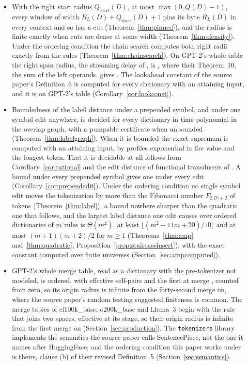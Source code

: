 \documentclass[11pt,a4paper]{article}
\theoremstyle{definition}
\theoremstyle{plain}
\newcommand{\code}[1]{\texttt{#1}}
\newcommand{\ripple}{R_{L}}
\begin{document}
\begin{itemize}
behavior gives the radius under every prepended string from its transitions alone, by the contraction of definite
automata \citep{steinby1969definite} (Corollary~\ref{cor:tail}).
\item With the right start radius \(Q_{\mathrm{start}}(D)\), at most \(\max(0, Q(D) - 1)\), every window of width
\(\ripple(D) + Q_{\mathrm{start}}(D) + 1\) pins its byte \(\ripple(D)\) in every context and so has a cut
(Theorem~\ref{thm:pinned}), and the radius is finite exactly when cuts are dense at some width
(Theorem~\ref{thm:density}). Under the ordering condition the chain search computes both right radii exactly from the
rules (Theorem~\ref{thm:chainsearch}). On GPT-2's whole table the right span radius, the streaming delay of
\citet{mamouras2026bpe}, is \ChainGptQspan{}, where their Theorem~10, the sum of the left operands, gives \ChainGptQD{}.
The lookahead constant of the source paper's Definition~6 is computed for every dictionary with an attaining input, and
it is \LookGptConstant{} on GPT-2's table (Corollary~\ref{cor:lookconst}).
\item Boundedness of the label distance under a prepended symbol, and under one symbol edit anywhere, is decided for
every dictionary in time polynomial in the overlap graph, with a pumpable certificate when unbounded
(Theorem~\ref{thm:labelgraph}). When it is bounded the exact supremum is computed with an attaining input, by profiles
exponential in the value and the longest token. That it is decidable at all follows from Corollary~\ref{cor:rational}
and the edit distance of functional transducers of \citet{aiswarya2024edit}. A bound under every prepended symbol gives
one under every edit (Corollary~\ref{cor:prependedit}). Under the ordering condition no single symbol edit moves the
tokenization by more than the Fibonacci number \(F_{2|D|+2}\) of tokens (Theorem~\ref{thm:label}), a bound nowhere
sharper than the quadratic one that follows, and the largest label distance one edit causes over ordered dictionaries of
\(m\) rules is \(\Theta(m^2)\), at least \(\lfloor (m^2 + 11m + 20)/10 \rfloor\) and at most \((m + 1)(m + 2)/2\) for
\(m \ge 1\) (Theorems~\ref{thm:amp} and~\ref{thm:quadratic}, Proposition~\ref{prop:staircaseinsert}), with the exact
constant computed over finite universes (Section~\ref{sec:ampcomputed}).
\item GPT-2's whole merge table, read as a dictionary with the pre-tokenizer not modeled, is ordered, with
\GptSelfPairs{} effective self-pairs and the first at merge \GptFinitePrefix{}, counted from zero, so its origin radius
is infinite from the forty-second merge on, where the source paper's random testing suggested finiteness is common. The
merge tables of cl100k\_base, o200k\_base and Llama~3 begin with the rule that joins two spaces, effective at its stage,
so their origin radius is infinite from the first merge on (Section~\ref{sec:production}). The \code{tokenizers} library
implements the semantics the source paper calls SentencePiece, not the one it names after HuggingFace, and the ordering
condition this paper works under is theirs, clause (b) of their revised Definition~5 (Section~\ref{sec:semantics}).
\end{itemize}
\end{document}
